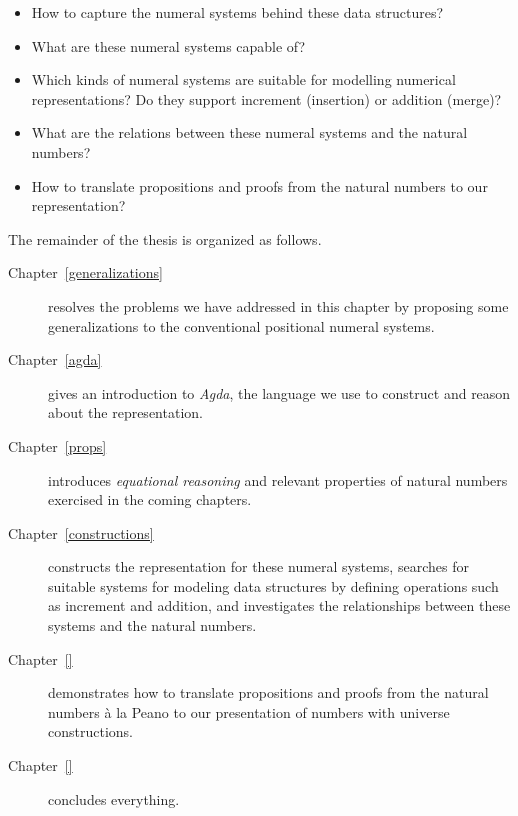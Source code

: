 \documentclass[\main/thesis.tex]{subfiles}
\begin{document}
\begin{itemize}
    \item How to capture the numeral systems behind these data structures?
    \item What are these numeral systems capable of?
    \item Which kinds of numeral systems are suitable for modelling numerical
        representations? Do they support increment (insertion) or addition (merge)?
    \item What are the relations between these numeral systems and the natural numbers?
    \item How to translate propositions and proofs from the natural numbers to
        our representation?
\end{itemize}

The remainder of the thesis is organized as follows.

\begin{description}
    \item[Chapter~\ref{generalizations}]
        resolves the problems we have addressed in this chapter by proposing
        some generalizations to the conventional positional numeral systems.
   \item[Chapter~\ref{agda}]
        gives an introduction to \textit{Agda}, the language we use to construct
        and reason about the representation.
   \item[Chapter~\ref{props}]
        introduces \textit{equational reasoning} and relevant properties
        of natural numbers exercised in the coming chapters.
   \item[Chapter~\ref{constructions}]
        constructs the representation for these numeral systems,
        searches for suitable systems for modeling data structures by
        defining operations such as increment and addition,
        and investigates the relationships between these systems and the natural numbers.
    \item[Chapter~\ref{}]
        demonstrates how to translate propositions and proofs from the natural
        numbers à la Peano to our presentation of numbers with universe
        constructions.
    \item[Chapter~\ref{}] concludes everything.
\end{description}


%
%
\end{document}
